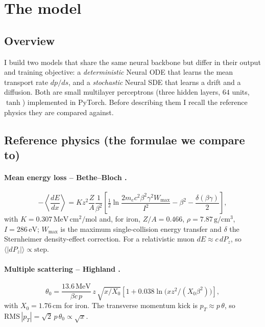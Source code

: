 \documentclass[11pt]{article}
\newcommand{\unit}[1]{\,\mathrm{#1}}
\begin{document}
\section{The model}
\subsection{Overview}
I build two models that share the same neural backbone but differ in their output
and training objective: a \emph{deterministic} Neural ODE that learns the mean
transport rate $dp/ds$, and a \emph{stochastic} Neural SDE that learns a drift
and a diffusion. Both are small multilayer perceptrons (three hidden layers,
$64$ units, $\tanh$) implemented in PyTorch. Before describing them I recall the
reference physics they are compared against.

\subsection{Reference physics (the formulae we compare to)}
\paragraph{Mean energy loss -- Bethe--Bloch \cite{pdg}.}
\begin{equation}
  -\left\langle\frac{dE}{dx}\right\rangle
   = K z^2 \frac{Z}{A}\frac{1}{\beta^2}
     \left[\tfrac12\ln\frac{2 m_e c^2\beta^2\gamma^2 W_{\max}}{I^2}
           - \beta^2 - \frac{\delta(\beta\gamma)}{2}\right],
  \label{eq:bb}
\end{equation}
with $K=0.307\unit{MeV\,cm^2/mol}$ and, for iron, $Z/A=0.466$,
$\rho=7.87\unit{g/cm^3}$, $I=286\unit{eV}$; $W_{\max}$ is the maximum
single-collision energy transfer and $\delta$ the Sternheimer density-effect
correction. For a relativistic muon $dE\approx c\,dP_z$, so
$\langle|dP_z|\rangle\propto\mathrm{step}$.

\paragraph{Multiple scattering -- Highland \cite{highland}.}
\begin{equation}
  \theta_0 = \frac{13.6\unit{MeV}}{\beta c\,p}\,z\,\sqrt{x/X_0}
             \left[1+0.038\ln\!\big(x z^2/(X_0\beta^2)\big)\right],
  \label{eq:highland}
\end{equation}
with $X_0=1.76\unit{cm}$ for iron. The transverse momentum kick is
$p_T\approx p\,\theta$, so $\mathrm{RMS}\,|p_T|=\sqrt2\,p\,\theta_0\propto\sqrt{x}$.
\end{document}
